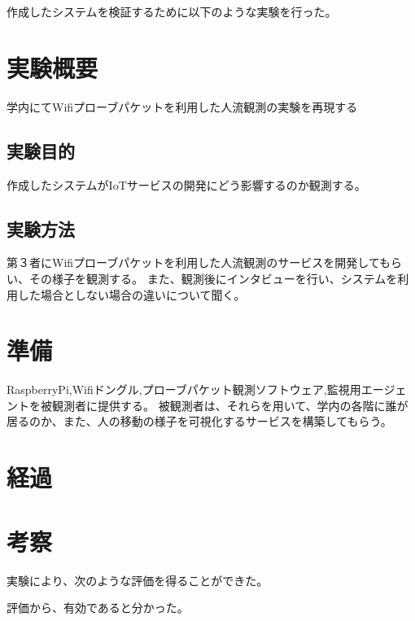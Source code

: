 作成したシステムを検証するために以下のような実験を行った。
\section{実験概要}
	学内にてWifiプローブパケットを利用した人流観測の実験を再現する
\subsection{実験目的}
	作成したシステムがIoTサービスの開発にどう影響するのか観測する。
\subsection{実験方法}
	第３者にWifiプローブパケットを利用した人流観測のサービスを開発してもらい、その様子を観測する。
	また、観測後にインタビューを行い、システムを利用した場合としない場合の違いについて聞く。
\section{準備}
	RaspberryPi,Wifiドングル,プローブパケット観測ソフトウェア,監視用エージェントを被観測者に提供する。
	被観測者は、それらを用いて、学内の各階に誰が居るのか、また、人の移動の様子を可視化するサービスを構築してもらう。
\section{経過}
\section{考察}


実験により、次のような評価を得ることができた。

評価から、有効であると分かった。

